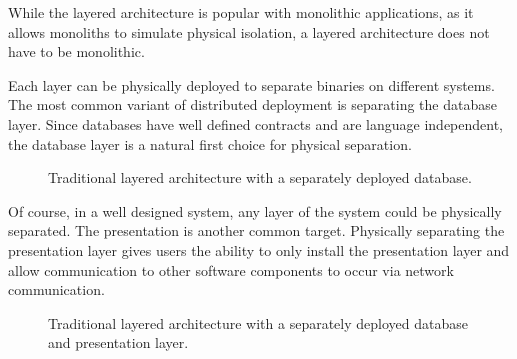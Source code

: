 While the layered architecture is popular with monolithic applications, as it allows monoliths to simulate physical isolation,
a layered architecture does not have to be monolithic.

Each layer can be physically deployed to separate binaries on different systems.
The most common variant of distributed deployment is separating the database layer.
Since databases have well defined contracts and are language independent, the database layer is a natural first choice for physical separation.

\begin{figure}[h]
    \centering
    \caption{Traditional layered architecture with a separately deployed database.}
    \label{fig:layered-db-separated}
\end{figure}

Of course, in a well designed system, any layer of the system could be physically separated.
The presentation is another common target.
Physically separating the presentation layer gives users the ability to only install the presentation layer and allow communication to
other software components to occur via network communication.

\begin{figure}[h]
    \centering
    \caption{Traditional layered architecture with a separately deployed database and presentation layer.}
    \label{fig:layered-db-pres-separated}
\end{figure}

